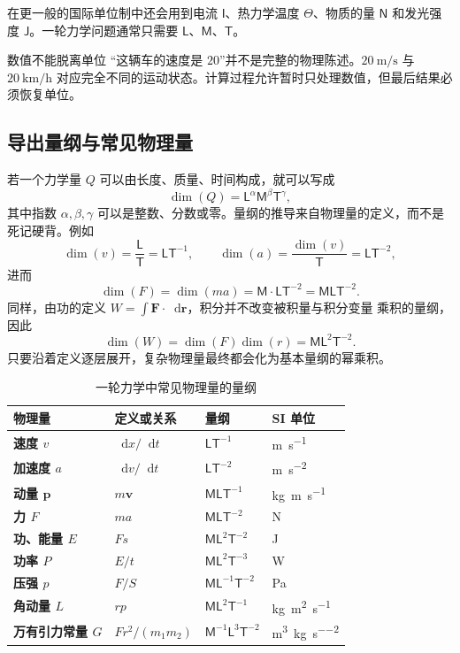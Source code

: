 \documentclass[UTF8,zihao=-4,oneside,openany]{ctexbook}
\numberwithin{equation}{section}
\newcommand{\dimens}[1]{\operatorname{dim}\!\left(#1\right)}
\newcommand{\dd}{\mathop{}\!\mathrm{d}}
\newcommand{\vect}[1]{\bm{#1}}
\begin{document}
在更一般的国际单位制中还会用到电流 $\mathsf{I}$、热力学温度 $\Theta$、物质的量 $\mathsf{N}$ 和发光强度 $\mathsf{J}$。一轮力学问题通常只需要 $\mathsf{L}$、$\mathsf{M}$、$\mathsf{T}$。

\begin{warningbox}{数值不能脱离单位}
“这辆车的速度是 $20$”并不是完整的物理陈述。$\SI{20}{\metre\per\second}$ 与 $\SI{20}{\kilo\metre\per\hour}$ 对应完全不同的运动状态。计算过程允许暂时只处理数值，但最后结果必须恢复单位。
\end{warningbox}

\subsection{导出量纲与常见物理量}

若一个力学量 $Q$ 可以由长度、质量、时间构成，就可以写成
\begin{equation}
  \dimens{Q}=\mathsf{L}^{\alpha}\mathsf{M}^{\beta}\mathsf{T}^{\gamma},
  \label{eq:dimension-general}
\end{equation}
其中指数 $\alpha,\beta,\gamma$ 可以是整数、分数或零。量纲的推导来自物理量的定义，而不是死记硬背。例如
\[
  \dimens{v}=\frac{\mathsf{L}}{\mathsf{T}}=\mathsf{LT}^{-1},
  \qquad
  \dimens{a}=\frac{\dimens{v}}{\mathsf{T}}=\mathsf{LT}^{-2},
\]
进而
\[
  \dimens{F}=\dimens{ma}
  =\mathsf{M}\cdot\mathsf{LT}^{-2}
  =\mathsf{MLT}^{-2}.
\]
同样，由功的定义 $W=\int \vect F\cdot\dd\vect r$，积分并不改变被积量与积分变量
乘积的量纲，因此
\[
  \dimens{W}=\dimens{F}\dimens{r}
  =\mathsf{ML}^{2}\mathsf{T}^{-2}.
\]
只要沿着定义逐层展开，复杂物理量最终都会化为基本量纲的幂乘积。

\begin{table}[htbp]
\centering
\caption{一轮力学中常见物理量的量纲}
\begin{tabularx}{\textwidth}{>{\bfseries}l >{\centering\arraybackslash}X >{\centering\arraybackslash}X l}
\toprule
物理量 & 定义或关系 & 量纲 & SI 单位 \\
\midrule
速度 $v$ & $\dd x/\dd t$ & $\mathsf{LT}^{-1}$ & \si{\metre\per\second} \\
加速度 $a$ & $\dd v/\dd t$ & $\mathsf{LT}^{-2}$ & \si{\metre\per\second\squared} \\
动量 $\vect p$ & $m\vect v$ & $\mathsf{MLT}^{-1}$ & \si{\kilogram\metre\per\second} \\
力 $F$ & $ma$ & $\mathsf{MLT}^{-2}$ & \si{\newton} \\
功、能量 $E$ & $Fs$ & $\mathsf{ML}^{2}\mathsf{T}^{-2}$ & \si{\joule} \\
功率 $P$ & $E/t$ & $\mathsf{ML}^{2}\mathsf{T}^{-3}$ & \si{\watt} \\
压强 $p$ & $F/S$ & $\mathsf{ML}^{-1}\mathsf{T}^{-2}$ & \si{\pascal} \\
角动量 $L$ & $rp$ & $\mathsf{ML}^{2}\mathsf{T}^{-1}$ & \si{\kilogram\metre\squared\per\second} \\
万有引力常量 $G$ & $Fr^2/(m_1m_2)$ & $\mathsf{M}^{-1}\mathsf{L}^{3}\mathsf{T}^{-2}$ & \si{\metre\cubed\per\kilogram\per\second\squared} \\
\bottomrule
\end{tabularx}
\end{table}
\end{document}
